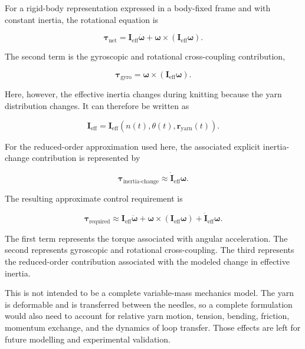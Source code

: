 \documentclass[12pt, a4paper]{article}
\begin{document}
For a rigid-body representation expressed in a body-fixed frame and with constant inertia, the rotational equation is

\begin{equation}
\boldsymbol{\tau}_{\text{net}}
=
\mathbf{I}_{\text{eff}}
\dot{\boldsymbol{\omega}}
+
\boldsymbol{\omega}
\times
\left(
\mathbf{I}_{\text{eff}}
\boldsymbol{\omega}
\right).
\end{equation}

The second term is the gyroscopic and rotational cross-coupling contribution,

\begin{equation}
\boldsymbol{\tau}_{\text{gyro}}
=
\boldsymbol{\omega}
\times
\left(
\mathbf{I}_{\text{eff}}
\boldsymbol{\omega}
\right).
\end{equation}

Here, however, the effective inertia changes during knitting because the yarn distribution changes. It can therefore be written as

\begin{equation}
\mathbf{I}_{\text{eff}}
=
\mathbf{I}_{\text{eff}}
\left(
n(t),
\theta(t),
\mathbf{r}_{\text{yarn}}(t)
\right).
\end{equation}

For the reduced-order approximation used here, the associated explicit inertia-change contribution is represented by

\begin{equation}
\boldsymbol{\tau}_{\text{inertia-change}}
\approx
\dot{\mathbf{I}}_{\text{eff}}
\boldsymbol{\omega}.
\end{equation}

The resulting approximate control requirement is

\begin{equation}
\boxed{
\boldsymbol{\tau}_{\text{required}}
\approx
\mathbf{I}_{\text{eff}}
\dot{\boldsymbol{\omega}}
+
\boldsymbol{\omega}
\times
\left(
\mathbf{I}_{\text{eff}}
\boldsymbol{\omega}
\right)
+
\dot{\mathbf{I}}_{\text{eff}}
\boldsymbol{\omega}
}.
\end{equation}

The first term represents the torque associated with angular acceleration. The second represents gyroscopic and rotational cross-coupling. The third represents the reduced-order contribution associated with the modeled change in effective inertia.

This is not intended to be a complete variable-mass mechanics model. The yarn is deformable and is transferred between the needles, so a complete formulation would also need to account for relative yarn motion, tension, bending, friction, momentum exchange, and the dynamics of loop transfer. Those effects are left for future modelling and experimental validation.
\end{document}
